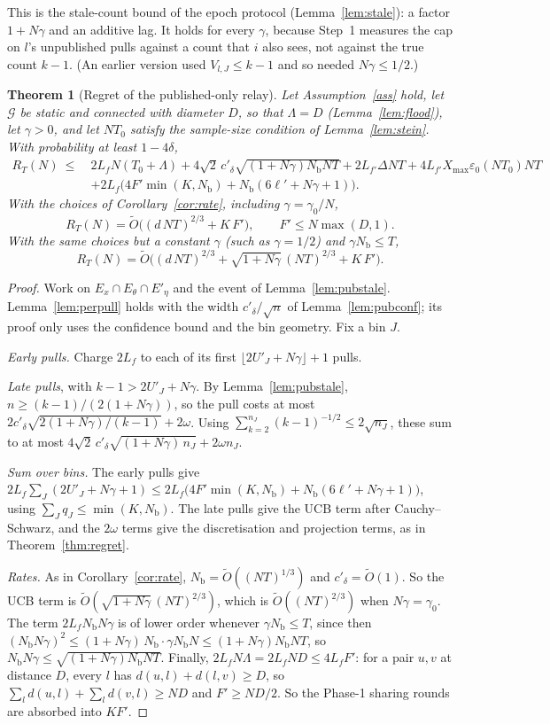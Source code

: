 \documentclass[11pt]{article}
\newtheorem{theorem}{Theorem}
\theoremstyle{definition}
\newcommand{\Nb}{N_{\mathrm b}}
\newcommand{\Xmax}{X_{\max}}
\newcommand{\eps}{\varepsilon}
\newcommand{\cG}{\mathcal{G}}
\begin{document}
This is the stale-count bound of the epoch protocol (Lemma~\ref{lem:stale}): a factor $1+N\gamma$ and an additive
lag. It holds for every $\gamma$, because Step~1 measures the cap on $l$'s unpublished pulls against a count that $i$
also sees, not against the true count $k-1$. (An earlier version used $V_{l,J}\le k-1$ and so needed $N\gamma\le1/2$.)

\begin{theorem}[Regret of the published-only relay]\label{thm:pubrelay}
Let Assumption~\ref{ass} hold, let $\cG$ be static and connected with diameter $D$, so that $\Lambda=D$
(Lemma~\ref{lem:flood}), let $\gamma>0$, and let $NT_0$ satisfy the sample-size condition of Lemma~\ref{lem:stein}.
With probability at least $1-4\delta$,
\begin{align*}
R_T(N)\ \le\ {}&2L_fN(T_0+\Lambda)+4\sqrt2\,c'_\delta\sqrt{(1+N\gamma)\Nb NT}+2L_{f'}\Delta NT+4L_{f'}\Xmax\eps_0(NT_0)NT\\
&+2L_f\Big(4F'\min(K,\Nb)+\Nb(6\ell'+N\gamma+1)\Big).
\end{align*}
With the choices of Corollary~\ref{cor:rate}, including $\gamma=\gamma_0/N$,
\[
R_T(N)=\tilde O\Big((d\,NT)^{2/3}+K\,F'\Big),\qquad F'\le N\max(D,1).
\]
With the same choices but a constant $\gamma$ (such as $\gamma=1/2$) and $\gamma\Nb\le T$,
\[
R_T(N)=\tilde O\Big((d\,NT)^{2/3}+\sqrt{1+N\gamma}\,(NT)^{2/3}+K\,F'\Big).
\]
\end{theorem}
\begin{proof}
Work on $E_x\cap E_\theta\cap E'_\eta$ and the event of Lemma~\ref{lem:pubstale}. Lemma~\ref{lem:perpull} holds with
the width $c'_\delta/\sqrt n$ of Lemma~\ref{lem:pubconf}; its proof only uses the confidence bound and the bin
geometry. Fix a bin $J$.

\emph{Early pulls.} Charge $2L_f$ to each of its first $\lfloor2U'_J+N\gamma\rfloor+1$ pulls.

\emph{Late pulls}, with $k-1>2U'_J+N\gamma$. By Lemma~\ref{lem:pubstale}, $n\ge(k-1)/(2(1+N\gamma))$, so the pull costs
at most $2c'_\delta\sqrt{2(1+N\gamma)/(k-1)}+2\omega$. Using $\sum_{k=2}^{n_J}(k-1)^{-1/2}\le2\sqrt{n_J}$, these sum to at
most $4\sqrt2\,c'_\delta\sqrt{(1+N\gamma)\,n_J}+2\omega n_J$.

\emph{Sum over bins.} The early pulls give $2L_f\sum_J(2U'_J+N\gamma+1)\le2L_f\big(4F'\min(K,\Nb)+\Nb(6\ell'+N\gamma+1)\big)$,
using $\sum_Jq_J\le\min(K,\Nb)$. The late pulls give the UCB term after Cauchy--Schwarz, and the $2\omega$ terms give
the discretisation and projection terms, as in Theorem~\ref{thm:regret}.

\emph{Rates.} As in Corollary~\ref{cor:rate}, $\Nb=\tilde O((NT)^{1/3})$ and $c'_\delta=\tilde O(1)$. So the UCB term
is $\tilde O(\sqrt{1+N\gamma}\,(NT)^{2/3})$, which is $\tilde O((NT)^{2/3})$ when $N\gamma=\gamma_0$. The term
$2L_f\Nb N\gamma$ is of lower order whenever $\gamma\Nb\le T$, since then
$(\Nb N\gamma)^2\le(1+N\gamma)\,\Nb\cdot\gamma\Nb N\le(1+N\gamma)\Nb NT$, so $\Nb N\gamma\le\sqrt{(1+N\gamma)\Nb NT}$.
Finally, $2L_fN\Lambda=2L_fND\le4L_fF'$: for a pair $u,v$ at distance $D$, every $l$ has $d(u,l)+d(l,v)\ge D$, so
$\sum_ld(u,l)+\sum_ld(v,l)\ge ND$ and $F'\ge ND/2$. So the Phase-1 sharing rounds are absorbed into $KF'$.
\end{proof}
\end{document}
